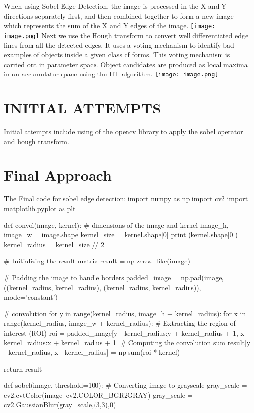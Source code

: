 \documentclass[letterpaper, 10 pt, conference]{ieeeconf}
\begin{document}
When using Sobel Edge Detection, the image is processed in the X and Y directions separately first, and then combined together to form a new image which represents the sum of the X and Y edges of the image.
    \centering
    \texttt{[image: image.png]}
Next we use the Hough transform to convert well differentiated edge lines from all the detected edges. It uses a voting mechanism to identify bad examples of objects inside a given class of forms. This voting mechanism is carried out in parameter space. Object candidates are produced as local maxima in an accumulator space using the HT algorithm.
    \centering
    \texttt{[image: image.png]}


\section{INITIAL ATTEMPTS}

Initial attempts include using of the opencv library to apply the sobel operator and hough transform. 


\section{Final Approach}
\textbf
The Final code for sobel edge detection:
import numpy as np
import cv2
import matplotlib.pyplot as plt

def convol(image, kernel):
    # dimensions of the image and kernel
    image_h, image_w = image.shape
    kernel_size = kernel.shape[0]
    print (kernel.shape[0])
    kernel_radius = kernel_size // 2
    
    # Initializing the result matrix
    result = np.zeros_like(image)
    
    # Padding the image to handle borders
    padded_image = np.pad(image, ((kernel_radius, kernel_radius), (kernel_radius, kernel_radius)), mode='constant')
    
    # convolution
    for y in range(kernel_radius, image_h + kernel_radius):
        for x in range(kernel_radius, image_w + kernel_radius):
            # Extracting the region of interest (ROI)
            roi = padded_image[y - kernel_radius:y + kernel_radius + 1, x - kernel_radius:x + kernel_radius + 1]
            # Computing the convolution sum
            result[y - kernel_radius, x - kernel_radius] = np.sum(roi * kernel)
    
    return result

def sobel(image, threshold=100):
    # Converting image to grayscale
    gray_scale = cv2.cvtColor(image, cv2.COLOR_BGR2GRAY)
    gray_scale = cv2.GaussianBlur(gray_scale,(3,3),0)
    
\end{document}

